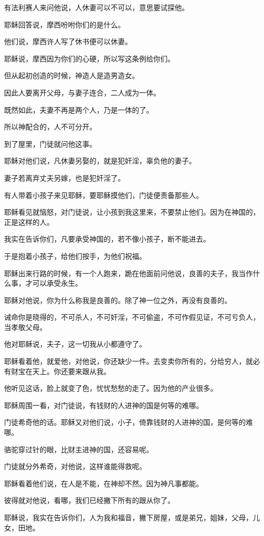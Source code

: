 \documentclass[12pt,oneside]{book}
\begin{document}
有法利赛人来问他说，人休妻可以不可以，意思要试探他。

耶稣回答说，摩西吩咐你们的是什么。

他们说，摩西许人写了休书便可以休妻。

耶稣说，摩西因为你们的心硬，所以写这条例给你们。

但从起初创造的时候，神造人是造男造女。

因此人要离开父母，与妻子连合，二人成为一体。

既然如此，夫妻不再是两个人，乃是一体的了。

所以神配合的，人不可分开。

到了屋里，门徒就问他这事。

耶稣对他们说，凡休妻另娶的，就是犯奸淫，辜负他的妻子。

妻子若离弃丈夫另嫁，也是犯奸淫了。

有人带着小孩子来见耶稣，要耶稣摸他们，门徒便责备那些人。

耶稣看见就恼怒，对门徒说，让小孩到我这里来，不要禁止他们。因为在神国的，正是这样的人。

我实在告诉你们，凡要承受神国的，若不像小孩子，断不能进去。

于是抱着小孩子，给他们按手，为他们祝福。

耶稣出来行路的时候，有一个人跑来，跪在他面前问他说，良善的夫子，我当作什么事，才可以承受永生。

耶稣对他说，你为什么称我是良善的。除了神一位之外，再没有良善的。

诫命你是晓得的，不可杀人，不可奸淫，不可偷盗，不可作假见证，不可亏负人，当孝敬父母。

他对耶稣说，夫子，这一切我从小都遵守了。

耶稣看着他，就爱他，对他说，你还缺少一件。去变卖你所有的，分给穷人，就必有财宝在天上。你还要来跟从我。

他听见这话，脸上就变了色，忧忧愁愁的走了。因为他的产业很多。

耶稣周围一看，对门徒说，有钱财的人进神的国是何等的难哪。

门徒希奇他的话。耶稣又对他们说，小子，倚靠钱财的人进神的国，是何等的难哪。

骆驼穿过针的眼，比财主进神的国，还容易呢。

门徒就分外希奇，对他说，这样谁能得救呢。

耶稣看着他们说，在人是不能，在神却不然。因为神凡事都能。

彼得就对他说，看哪，我们已经撇下所有的跟从你了。

耶稣说，我实在告诉你们，人为我和福音，撇下房屋，或是弟兄，姐妹，父母，儿女，田地。
\end{document}
